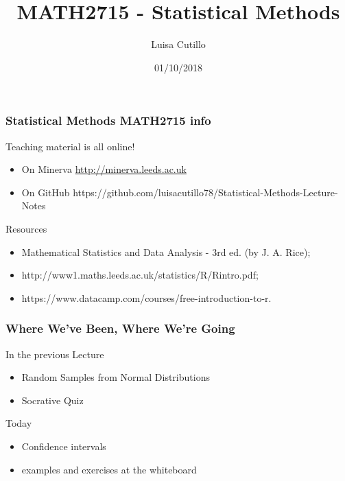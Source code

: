 \documentclass[xcolor=dvipsnames]{beamer}
\title{MATH2715 - Statistical Methods}
\author[L. Cutillo]{Luisa Cutillo}
\institute[Univ. of Leeds] {School of Mathematics, University of Leeds \\ l.cutillo@leeds.ac.uk}
\date[]{\tiny 01/10/2018 }
\begin{document}
\begin{frame}
\frametitle{ Statistical Methods MATH2715 info}
\begin{alertblock}{Teaching material is all online!}
\begin{itemize}
\item On Minerva \url{http://minerva.leeds.ac.uk}
\item On GitHub https://github.com/luisacutillo78/Statistical-Methods-Lecture-Notes
\end{itemize}
\end{alertblock}

\begin{alertblock}{Resources}
\begin{itemize}
\item Mathematical Statistics and Data Analysis - 3rd ed. (by J. A. Rice);
\item http://www1.maths.leeds.ac.uk/statistics/R/Rintro.pdf;
\item https://www.datacamp.com/courses/free-introduction-to-r.
\end{itemize}
\end{alertblock}

\end{frame}

\begin{frame}
\frametitle{Where We've Been, Where We're Going}

\begin{alertblock}{In the previous Lecture}

\begin{itemize}
\item Random Samples from Normal Distributions
\item Socrative Quiz
\end{itemize}
\end{alertblock}

\begin{alertblock}{Today}
\begin{itemize}
\item Confidence intervals
\item examples and exercises at the whiteboard
\end{itemize}
\end{alertblock}
\end{frame}
\end{document}
